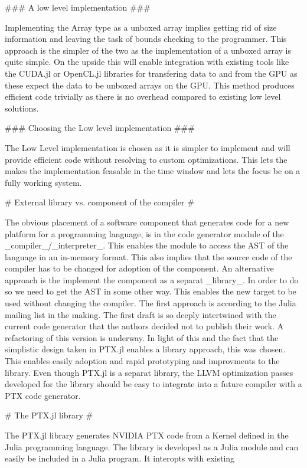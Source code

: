 \begin{markdown}
### A low level implementation ###

Implementing the Array type as a unboxed array implies getting rid of
size information and leaving the task of bounds checking to the
programmer. This approach is the simpler of the two as the
implementation of a unboxed array is quite simple. On the upside this
will enable integration with existing tools like the CUDA.jl or
OpenCL.jl libraries for transfering data to and from the GPU as these
expect the data to be unboxed arrays on the GPU. This method produces
efficient code trivially as there is no overhead compared to existing
low level solutions.

### Choosing the Low level implementation ###

The Low Level implementation is chosen as it is simpler to implement
and will provide efficient code without resolving to custom
optimizations. This lets the makes the implementation feasable in the
time window and lets the focus be on a fully working system. 

# External library vs. component of the compiler #

The obvious placement of a software component that generates code for
a new platform for a programming language, is in the code generator
module of the _compiler_/_interpreter_. This enables the module to
access the AST of the language in an in-memory format. This also
implies that the source code of the compiler has to be changed for
adoption of the component. An alternative approach is the implement
the component as a separat _library_. In order to do so we need to get
the AST in some other way. This enables the new target to be used
without changing the compiler. The first approach is according to the
Julia mailing list in the making. The first draft is so deeply
intertwined with the current code generator that the authors decided
not to publish their work. A refactoring of this version is
underway. In light of this and the fact that the simplistic design
taken in PTX.jl enables a library approach, this was chosen. This
enables easily adoption and rapid prototyping and improvments to the
library. Even though PTX.jl is a separat library, the LLVM
optimization passes developed for the library should be easy to
integrate into a future compiler with a PTX code generator.

# The PTX.jl library #
\label{sec:meth:ptx}
  
The PTX.jl library generates NVIDIA PTX code from a Kernel defined in
the Julia programming language. The library is developed as a Julia
module and can easily be included in a Julia program. It interopts
with existing 


\end{markdown}

